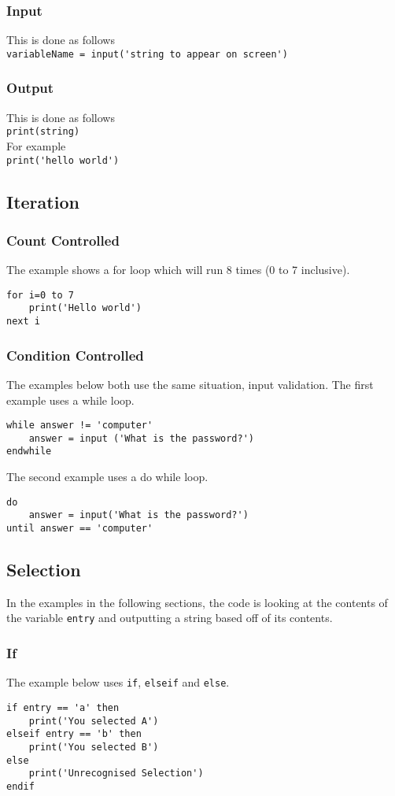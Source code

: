 \documentclass[a4paper,11pt]{article}
\begin{document}
\subsubsection{Input}
This is done as follows\\
\verb|variableName = input('string to appear on screen')|
\subsubsection{Output}
This is done as follows\\
\verb|print(string)|\\
For example\\
\verb|print('hello world')|
\subsection{Iteration}
\subsubsection{Count Controlled}
The example shows a for loop which will run 8 times (0 to 7 inclusive).
\begin{Verbatim}[breaklines=true, breakanywhere=true]
for i=0 to 7
    print('Hello world')
next i
\end{Verbatim}
\subsubsection{Condition Controlled}
The examples below both use the same situation, input validation. The first example uses a while loop.
\begin{Verbatim}[breaklines=true, breakanywhere=true]
while answer != 'computer'
    answer = input ('What is the password?')
endwhile
\end{Verbatim}
The second example uses a do while loop.
\begin{Verbatim}[breaklines=true, breakanywhere=true]
do
    answer = input('What is the password?')
until answer == 'computer'
\end{Verbatim}
\subsection{Selection}
In the examples in the following sections, the code is looking at the contents of the variable \verb|entry| and outputting a string based off of its contents.
\subsubsection{If}
The example below uses \verb|if|, \verb|elseif| and \verb|else|.
\begin{Verbatim}[breaklines=true, breakanywhere=true]
if entry == 'a' then
    print('You selected A')
elseif entry == 'b' then
    print('You selected B')
else
    print('Unrecognised Selection')
endif
\end{Verbatim}
\end{document}
